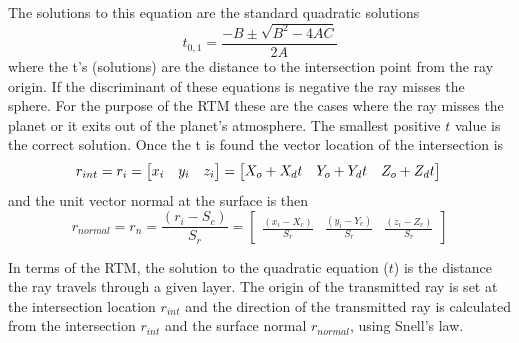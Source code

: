 The solutions to this equation are the standard quadratic solutions
\begin{equation}
t_{0,1} = \frac{-B\pm\sqrt{B^2-4AC}}{2A}
\end{equation}
where the t's (solutions) are the distance to the intersection point from the ray origin. If the discriminant of these equations is negative the ray misses the sphere. For the purpose of the RTM these are the cases where the ray misses the planet or it exits out of the planet's atmosphere. The smallest positive $t$ value is the correct solution. Once the t is found the vector location of the intersection is
\begin{equation}
r_{int} = r_i = \left[ \begin{matrix} x_i&y_i&z_i \end{matrix}\right] = \left[ \begin{matrix} X_o + X_dt&Y_o + Y_dt&Z_o + Z_dt \end{matrix}\right]\\
\end{equation}
and the unit vector normal at the surface is then
\begin{equation}
r_{normal} = r_n = \frac{(r_i-S_c)}{S_r} =\left[ \begin{matrix} \frac{(x_i-X_c)}{S_r} &\frac{(y_i-Y_c)}{S_r} & \frac{(z_i-Z_c)}{S_r} \end{matrix}\right]
\end{equation}

In terms of the RTM, the solution to the quadratic equation ($t$) is the distance the ray travels through a given layer. The origin of the transmitted ray is set at the intersection location $r_{int}$ and the direction of the transmitted ray is calculated from the intersection $r_{int}$ and the surface normal $r_{normal}$, using Snell's law.

